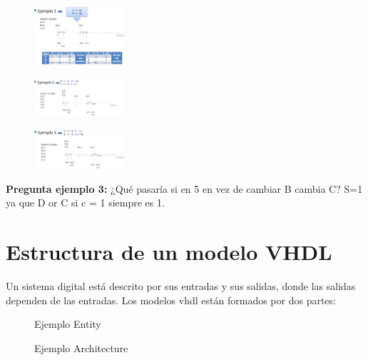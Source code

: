 \begin{multicols}{3}
	\begin{figure}[H]
		\centering
		\includegraphics[width=0.3\textwidth]{images/Tema_1/VHDL_Ejemplo_1.PNG}
	\end{figure}
	\vfill
	\begin{figure}[H]
		\centering
		\includegraphics[width=0.3\textwidth]{images/Tema_1/VHDL_Ejemplo_2.PNG}
	\end{figure}
	\vfill
	\begin{figure}[H]
		\centering
		\includegraphics[width=0.3\textwidth]{images/Tema_1/VHDL_Ejemplo_3.PNG}
	\end{figure}
\end{multicols}


\textbf{Pregunta ejemplo 3: }¿Qué pasaría si en 5 en vez de cambiar B cambia C? S=1 ya que D or C si c = 1 siempre es 1.


\section{Estructura de un modelo VHDL}
Un sistema digital está descrito por sus entradas y sus salidas, donde las salidas dependen de las entradas.
Los modelos \gls{vhdl} están formados por dos partes:
\begin{multicols}{2}
	\begin{figure}[H]
		\centering
		
		\caption{Ejemplo Entity}
	\end{figure}
	\vfill
	\begin{figure}[H]
		\centering
		
		\caption{Ejemplo Architecture}
	\end{figure}
\end{multicols}

